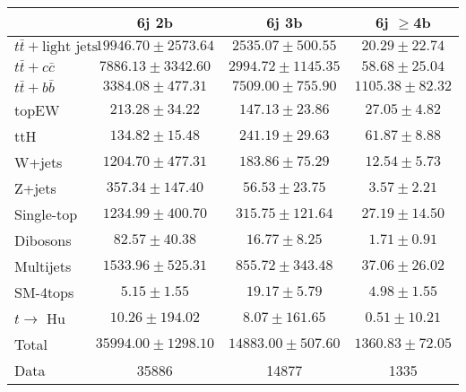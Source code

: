 \begin{table}
\begin{center}
  \begin{tabular}{ | l |  c |  c |  c | }
    \hline \hline 
     & 6j 2b  & 6j 3b  & 6j $\geq$4b  \\ 
    \hline 
     $t\bar{t}+\text{light jets}$  &   $ 19946.70 \pm 2573.64 $ &   $ 2535.07 \pm 500.55 $ &   $ 20.29 \pm 22.74 $ \\ 
     $t\bar{t}+c\bar{c}$  &   $ 7886.13 \pm 3342.60 $ &   $ 2994.72 \pm 1145.35 $ &   $ 58.68 \pm 25.04 $ \\ 
     $t\bar{t}+b\bar{b}$  &   $ 3384.08 \pm 477.31 $ &   $ 7509.00 \pm 755.90 $ &   $ 1105.38 \pm 82.32 $ \\ 
    topEW  &   $ 213.28 \pm 34.22 $ &   $ 147.13 \pm 23.86 $ &   $ 27.05 \pm 4.82 $ \\ 
    ttH  &   $ 134.82 \pm 15.48 $ &   $ 241.19 \pm 29.63 $ &   $ 61.87 \pm 8.88 $ \\ 
    W+jets  &   $ 1204.70 \pm 477.31 $ &   $ 183.86 \pm 75.29 $ &   $ 12.54 \pm 5.73 $ \\ 
    Z+jets  &   $ 357.34 \pm 147.40 $ &   $ 56.53 \pm 23.75 $ &   $ 3.57 \pm 2.21 $ \\ 
    Single-top  &   $ 1234.99 \pm 400.70 $ &   $ 315.75 \pm 121.64 $ &   $ 27.19 \pm 14.50 $ \\ 
    Dibosons  &   $ 82.57 \pm 40.38 $ &   $ 16.77 \pm 8.25 $ &   $ 1.71 \pm 0.91 $ \\ 
    Multijets  &   $ 1533.96 \pm 525.31 $ &   $ 855.72 \pm 343.48 $ &   $ 37.06 \pm 26.02 $ \\ 
    SM-4tops  &   $ 5.15 \pm 1.55 $ &   $ 19.17 \pm 5.79 $ &   $ 4.98 \pm 1.55 $ \\ 
     $t\rightarrow$ Hu  &   $ 10.26 \pm 194.02 $ &   $ 8.07 \pm 161.65 $ &   $ 0.51 \pm 10.21 $ \\ 
    Total  &   $ 35994.00 \pm 1298.10 $ &   $ 14883.00 \pm 507.60 $ &   $ 1360.83 \pm 72.05 $ \\ 
    \hline 
    Data  & 35886  & 14877  & 1335  \\ 
    \hline \hline 
  \end{tabular} 


\end{center}
\end{table}
